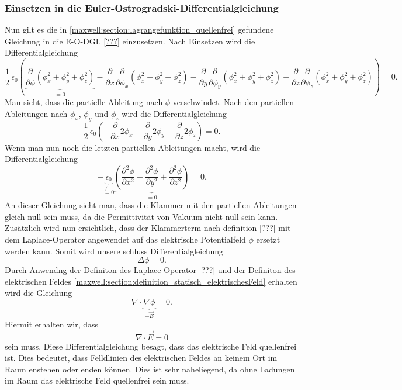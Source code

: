 \subsubsection{Einsetzen in die Euler-Ostrogradski-Differentialgleichung}
Nun gilt es die in \eqref{maxwell:section:lagrangefunktion_quellenfrei} gefundene Gleichung in die E-O-DGL \ref{???} einzusetzen.
Nach Einsetzen wird die Differentialgleichung
\[
\frac{1}{2}\,\epsilon_0\left(\underbrace{\frac{\partial}{\partial\phi}\left(\phi_x^2 + \phi_y^2 + \phi_z^2\right)}_{=0} - \frac{\partial}{\partial x}\frac{\partial}{\partial \phi_x}\left(\phi_x^2 + \phi_y^2 + \phi_z^2\right) - 
\frac{\partial}{\partial y}\frac{\partial}{\partial \phi_y}\left(\phi_x^2 + \phi_y^2 + \phi_z^2\right) - 
\frac{\partial}{\partial z}\frac{\partial}{\partial \phi_z}\left(\phi_x^2 + \phi_y^2 + \phi_z^2\right)\right)
=
0.
\]
Man sieht, dass die partielle Ableitung nach $\phi$ verschwindet.
Nach den partiellen Ableitungen nach $\phi_x$, $\phi_y$ und $\phi_z$ wird die Differentialgleichung
\[
\frac{1}{2}\,\epsilon_0\left(-\frac{\partial}{\partial x}2\phi_x - \frac{\partial}{\partial y}2\phi_y - \frac{\partial}{\partial z}2\phi_z\right)
=
0.
\]
Wenn man nun noch die letzten partiellen Ableitungen macht, wird die Differentialgleichung
\begin{equation}
	- \underbrace{\epsilon_0}_{\not{=}0}\underbrace{\left(\frac{\partial^2\phi}{\partial x^2} + \frac{\partial^2\phi}{\partial y^2} + \frac{\partial^2\phi}{\partial z^2}\right)}_{=0}
	=
	0.
	\label{maxwell:section:laplace_gleichung_1}
\end{equation}
An dieser Gleichung sieht man, dass die Klammer mit den partiellen Ableitungen gleich null sein muss, da die Permittivität von Vakuum nicht null sein kann.
Zusätzlich wird nun ersichtlich, dass der Klammerterm nach definition \ref{???} mit dem Laplace-Operator angewendet auf das elektrische Potentialfeld $\phi$ ersetzt werden kann.
Somit wird unsere schluss Differentialgleichung
\begin{equation}
	\Delta\phi
	=
	0.
	\label{maxwell:section:laplace_gleichung_2}
\end{equation}
Durch Anwendng der Definiton des Laplace-Operator \ref{???} und der Definiton des elektrischen Feldes \eqref{maxwell:section:definition_statisch_elektrischesFeld} erhalten wird die Gleichung
\[
\nabla\cdot\underbrace{\nabla\phi}_{-\vec{E}}
=
0.
\]
Hiermit erhalten wir, dass
\begin{equation}
	\nabla\cdot\vec{E}
	=
	0
	\label{maxwell:section:e_feld_quellenfrei}
\end{equation}
sein muss. Diese Differentialgleichung besagt, dass das elektrische Feld quellenfrei ist.
Dies bedeutet, dass Felldlinien des elektrischen Feldes an keinem Ort im Raum enstehen oder enden können.
Dies ist sehr naheliegend, da ohne Ladungen im Raum das elektrische Feld quellenfrei sein muss.

